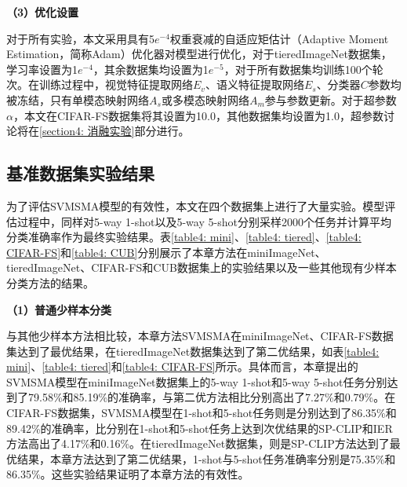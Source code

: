 \textbf{（3）优化设置}

对于所有实验，本文采用具有5$e^{-4}$权重衰减的自适应矩估计（Adaptive Moment Estimation，简称Adam）优化器对模型进行优化，对于tieredImageNet数据集，学习率设置为1$e^{-4}$，其余数据集均设置为1$e^{-5}$，对于所有数据集均训练100个轮次。在训练过程中，视觉特征提取网络$E_v$、语义特征提取网络$E_s$、分类器$C$参数均被冻结，只有单模态映射网络$A_s$或多模态映射网络$A_m$参与参数更新。对于超参数$\alpha$，本文在CIFAR-FS数据集将其设置为10.0，其他数据集均设置为1.0，超参数讨论将在\ref{section4: 消融实验}部分进行。

\subsection[\hspace{-2pt}基准数据集实验结果]{{\heiti{} \hspace{-8pt}基准数据集实验结果}}\label{section4: 基准数据集实验结果}

为了评估SVMSMA模型的有效性，本文在四个数据集上进行了大量实验。模型评估过程中，同样对5-way 1-shot以及5-way 5-shot分别采样2000个任务并计算平均分类准确率作为最终实验结果。表\ref{table4: mini}、\ref{table4: tiered}、\ref{table4: CIFAR-FS}和\ref{table4: CUB}分别展示了本章方法在miniImageNet、tieredImageNet、CIFAR-FS和CUB数据集上的实验结果以及一些其他现有少样本分类方法的结果。

\textbf{（1）普通少样本分类}

与其他少样本方法相比较，本章方法SVMSMA在miniImageNet、CIFAR-FS数据集达到了最优结果，在tieredImageNet数据集达到了第二优结果，如表\ref{table4: mini}、\ref{table4: tiered}和\ref{table4: CIFAR-FS}所示。具体而言，本章提出的SVMSMA模型在miniImageNet数据集上的5-way 1-shot和5-way 5-shot任务分别达到了79.58\%和85.19\%的准确率，与第二优方法相比分别高出了7.27\%和0.79\%。在CIFAR-FS数据集，SVMSMA模型在1-shot和5-shot任务则是分别达到了86.35\%和89.42\%的准确率，比分别在1-shot和5-shot任务上达到次优结果的SP-CLIP和IER方法高出了4.17\%和0.16\%。在tieredImageNet数据集，则是SP-CLIP方法达到了最优结果，本章方法达到了第二优结果，1-shot与5-shot任务准确率分别是75.35\%和86.35\%。这些实验结果证明了本章方法的有效性。

